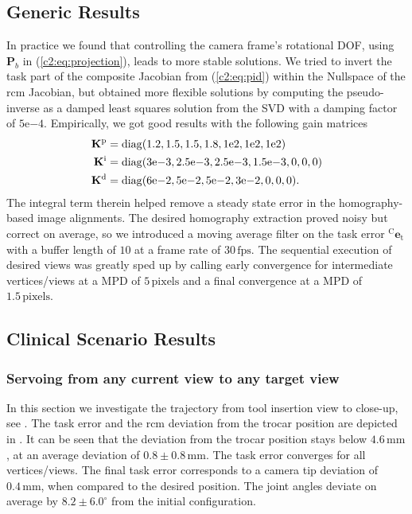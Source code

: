 \subsection{Generic Results}
\label{c2:sec:generic_res}
In practice we found that controlling the camera frame's rotational DOF, using $\mathbf{P}_b$ in (\eqref{c2:eq:projection}), leads to more stable solutions. We tried to invert the task part of the composite Jacobian from (\eqref{c2:eq:pid}) within the Nullspace of the \acrshort{rcm} Jacobian, but obtained more flexible solutions by computing the pseudo-inverse as a damped least squares solution from the SVD with a damping factor of $5\mathrm{e}{-4}$. Empirically, we got good results with the following gain matrices
\begin{equation*}
    \begin{split}
        \mathbf{K}^\text{p} &= \operatorname{diag}(1.2, 1.5, 1.5, 1.8, 1\mathrm{e}{2}, 1\mathrm{e}{2}, 1\mathrm{e}{2}) \\
        \mathbf{K}^\text{i} &= \operatorname{diag}(3\mathrm{e}{-3}, 2.5\mathrm{e}{-3},2.5\mathrm{e}{-3}, 1.5\mathrm{e}{-3}, 0, 
    0, 0)\\
        \mathbf{K}^\text{d} &= \operatorname{diag}(6\mathrm{e}{-2}, 5\mathrm{e}{-2}, 5\mathrm{e}{-2}, 3\mathrm{e}{-2}, 0, 0, 0).
    \end{split}
\end{equation*}
The integral term therein helped remove a steady state error in the homography-based image alignments. The desired homography extraction proved noisy but correct on average, so we introduced a moving average filter on the task error $^\text{C}\mathbf{e}_\text{t}$ with a buffer length of $10$ at a frame rate of $30\,\text{fps}$. The sequential execution of desired views was greatly sped up by calling early convergence for intermediate vertices/views at a MPD of $5\,\text{pixels}$ and a final convergence at a MPD of $1.5\,\text{pixels}$. 

\subsection{Clinical Scenario Results}
\label{c2:sec:clin_res}
\subsubsection{Servoing from any current view to any target view}
\label{c2:sec:clin_res_any}

In this section we investigate the trajectory from tool insertion view to close-up, see . The task error and the \acrshort{rcm} deviation from the trocar position are depicted in . It can be seen that the deviation from the trocar position stays below $4.6\,\text{mm}$, at an average deviation of $0.8\pm0.8\,\text{mm}$. The task error converges for all vertices/views. The final task error corresponds to a camera tip deviation of $0.4\,\text{mm}$, when compared to the desired position. The joint angles deviate on average by $8.2\pm6.0^\circ$ from the initial configuration.

